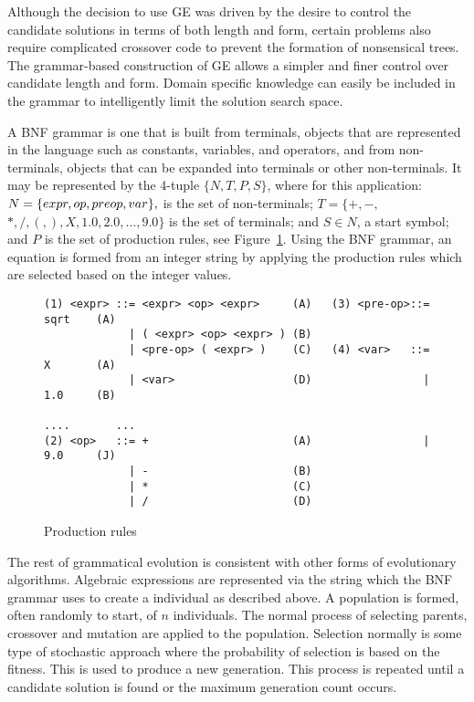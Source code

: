 \documentclass[12pt]{article}
\begin{document}
Although the decision to use GE was driven by the desire to control
the candidate solutions in terms of both length and form, certain
problems also require complicated crossover code to prevent the
formation of nonsensical trees. The grammar-based construction of GE
allows a simpler and finer control over candidate length and
form. Domain specific knowledge can easily be included in the grammar
to intelligently limit the solution search space.


A BNF grammar is one that is built from terminals, objects that are
represented in the language such as constants, variables, and
operators, and from non-terminals, objects that can be expanded into
terminals or other non-terminals.  It may be represented by the
4-tuple $\{ N, T, P, S \}$, where for this application: $N = \{ expr ,
op , pre\-op , var\}, $ is the set of non-terminals; $T = \{ +, - ,$
$ * , /, (, ), X, 1.0, 2.0, \dots , 9.0 \}$ is the set of terminals;
and $S \in N$, a start symbol; and $P$ is the set of production rules,
see Figure~\ref{grammar}.  Using the BNF grammar, an equation is formed from an
integer string by applying the production rules which are selected
based on the integer values.

\begin{figure}[tbh]
{\color{blue} 
{\footnotesize
\begin{verbatim}
(1) <expr> ::= <expr> <op> <expr>     (A)   (3) <pre-op>::= sqrt    (A)
             | ( <expr> <op> <expr> ) (B)
             | <pre-op> ( <expr> )    (C)   (4) <var>   ::= X       (A)
             | <var>                  (D)                 | 1.0     (B)
                                                         ....       ...
(2) <op>   ::= +                      (A)                 | 9.0     (J)
             | -                      (B)
             | *                      (C)
             | /                      (D) 
\end{verbatim}
}}
\caption{Production rules\label{grammar}}
\end{figure}

The rest of grammatical evolution is consistent with other forms of
evolutionary algorithms.  Algebraic expressions are represented via
the string which the BNF grammar uses to create a individual as
described above.  A population is formed, often randomly to start, of
$n$ individuals.  The normal process of selecting parents, crossover
and mutation are applied to the population.  Selection normally is
some type of stochastic approach where the probability of selection is
based on the fitness.   This is used to produce a
new generation.  This process is repeated until a candidate solution
is found or the maximum generation count occurs.
\end{document}
